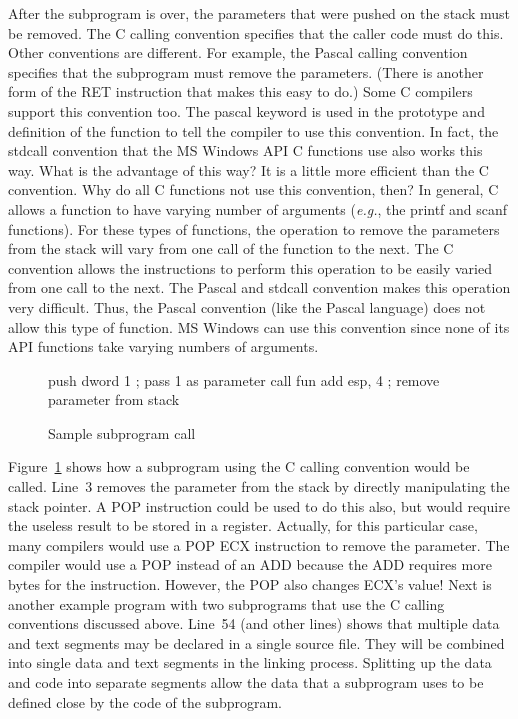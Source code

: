 After the subprogram is over, the parameters that were pushed on the
stack must be removed. The C calling convention  specifies that the caller code must do this. Other
conventions are different. For example, the Pascal calling convention
 specifies that the subprogram must
remove the parameters.  (There is another form of the RET 
instruction that makes this easy to do.) Some C compilers support this
convention too. The {\code pascal} keyword is used in the prototype
and definition of the function to tell the compiler to use this
convention. In fact, the {\code stdcall} convention  that the MS Windows API C functions use also works
this way.  What is the advantage of this way? It is a little more
efficient than the C convention. Why do all C functions not use this
convention, then? In general, C allows a function to have varying
number of arguments (\emph{e.g.}, the {\code printf} and {\code scanf}
functions). For these types of functions, the operation to remove the
parameters from the stack will vary from one call of the function to
the next. The C convention allows the instructions to perform this
operation to be easily varied from one call to the next. The Pascal
and stdcall convention makes this operation very difficult. Thus, the
Pascal convention (like the Pascal language) does not allow this type
of function. MS Windows can use this convention since none of its API
functions take varying numbers of arguments.

\begin{figure}[t]
\begin{AsmCodeListing}[frame=single]
      push   dword 1        ; pass 1 as parameter
      call   fun
      add    esp, 4         ; remove parameter from stack
\end{AsmCodeListing}
\caption{Sample subprogram call \label{fig:subcall}}
\end{figure}

Figure~\ref{fig:subcall} shows how a subprogram using the C calling
convention would be called. Line~3 removes the parameter from the
stack by directly manipulating the stack pointer. A {\code POP}
instruction could be used to do this also, but would require the
useless result to be stored in a register. Actually, for this
particular case, many compilers would use a {\code POP ECX}
instruction to remove the parameter. The compiler would use a {\code
POP} instead of an {\code ADD} because the {\code ADD} requires more
bytes for the instruction. However, the {\code POP} also changes ECX's
value! Next is another example program with two subprograms that use
the C calling conventions discussed above. Line~54 (and other lines)
shows that multiple data and text segments may be declared in a single
source file. They will be combined into single data and text segments
in the linking process. Splitting up the data and code into separate
segments allow the data that a subprogram uses to be defined close by
the code of the subprogram.

